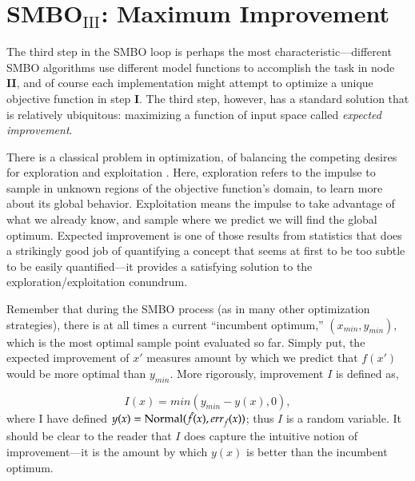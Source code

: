 
\section{SMBO$_{\text{III}}$: Maximum Improvement}\label{sec:max_imp}

The third step in the SMBO loop is perhaps the most characteristic---different SMBO algorithms use different model functions to accomplish the task in node \textbf{II}, and of course each implementation might attempt to optimize a unique objective function in step \textbf{I}. The third step, however, has a standard solution that is relatively ubiquitous: maximizing a function of input space called \emph{expected improvement}. 

There is a classical problem in optimization, of balancing the competing desires for exploration and exploitation \cite{John Holland}. Here, exploration refers to the impulse to sample in unknown regions of the objective function's domain, to learn more about its global behavior. Exploitation means the impulse to take advantage of what we already know, and sample where we predict we will find the global optimum. Expected improvement is one of those results from statistics that does a strikingly good job of quantifying a concept that seems at first to be too subtle to be easily quantified---it provides a satisfying solution to the exploration/exploitation conundrum.

Remember that during the SMBO process (as in many other optimization strategies), there is at all times a current ``incumbent optimum,'' $(x_{min},y_{min})$, which is the most optimal sample point evaluated so far. Simply put, the expected improvement of $x'$ measures amount by which we predict that $f(x')$ would be more optimal than $y_{min}$. More rigorously, improvement $I$ is defined as,

\begin{equation} \label{eq:improvement}
I(x) = min(y_{min}-y(x),0),
\end{equation}
where I have defined $y(x)=\text{Normal}(\hat{f}(x),err_{\hat{f}}(x))$; thus $I$ is a random variable. It should be clear to the reader that $I$ does capture the intuitive notion of improvement---it is the amount by which $y(x)$ is better than the incumbent optimum.

